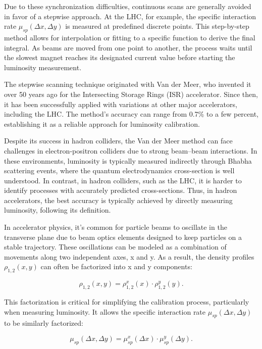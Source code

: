 Due to these synchronization difficulties, continuous scans are generally avoided in favor of a stepwise approach. At the LHC, for example, the specific interaction rate $\mu_{sp}(\Delta x,\Delta y)$ is measured at predefined discrete points. This step-by-step method allows for interpolation or fitting to a specific function to derive the final integral. As beams are moved from one point to another, the process waits until the slowest magnet reaches its designated current value before starting the luminosity measurement.

The stepwise scanning technique originated with Van der Meer, who invented it over 50 years ago for the Intersecting Storage Rings (ISR) accelerator\cite{Carboni:156499}. Since then, it has been successfully applied with variations at other major accelerators\cite{Rubbia:1025746}, including the LHC. The method's accuracy can range from 0.7\% to a few percent, establishing it as a reliable approach for luminosity calibration.

Despite its success in hadron colliders, the Van der Meer method can face challenges in electron-positron colliders due to strong beam–beam interactions. In these environments, luminosity is typically measured indirectly through Bhabha scattering events, where the quantum electrodynamics cross-section is well understood. In contrast, in hadron colliders, such as the LHC, it is harder to identify processes with accurately predicted cross-sections. Thus, in hadron accelerators, the best accuracy is typically achieved by directly measuring luminosity, following its definition.

In accelerator physics, it's common for particle beams to oscillate in the transverse plane due to beam optics elements designed to keep particles on a stable trajectory. These oscillations can be modeled as a combination of movements along two independent axes, x and y. As a result, the density profiles \(\rho _{1,2}(x, y)\) can often be factorized into x and y components:

\begin{equation}
\rho _{1,2}(x, y) = \rho _{1,2}^x(x) \cdot \rho _{1,2}^y(y).
\end{equation}

This factorization is critical for simplifying the calibration process, particularly when measuring luminosity. It allows the specific interaction rate \(\mu_{sp}(\Delta x, \Delta y)\) to be similarly factorized:

\begin{equation}
\mu _{sp}(\Delta x, \Delta y) = \mu ^x_{sp}(\Delta x) \cdot \mu ^y_{sp}(\Delta y).
\end{equation}


